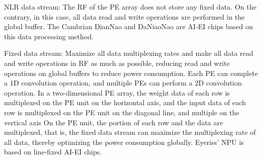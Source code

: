 \documentclass[UTF8,12pt,a4paper]{article}
\begin{document}
NLR data stream: The RF of the PE array does not store any fixed data.
On the contrary, in this case, all data read and write operations are performed in the global buffer.
The Cambrian DianNao and DaNiaoNao are AI-EI chips based on this data processing method.

Fixed data stream: Maximize all data multiplexing rates and make all data read and write operations in RF as much as possible,
reducing read and write operations on global buffers to reduce power consumption.
Each PE can complete a 1D convolution operation,
and multiple PEs can perform a 2D convolution operation.
In a two-dimensional PE array, the weight data of each row is multiplexed on the PE unit on the horizontal axis,
and the input data of each row is multiplexed on the PE unit on the diagonal line,
and multiple on the vertical axis On the PE unit,
the portion of each row and the data are multiplexed, that is,
the fixed data stream can maximize the multiplexing rate of all data,
thereby optimizing the power consumption globally.
Eyeriss' NPU is based on line-fixed AI-EI chips.

\clearpage






\newpage
\end{document}
